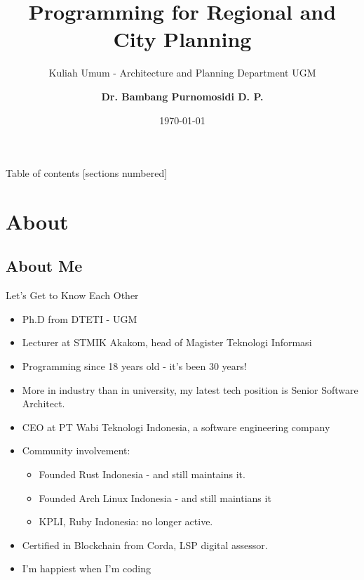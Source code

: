 \documentclass[10pt]{beamer}
\title{Programming for Regional and City Planning}
\subtitle{Kuliah Umum - Architecture and Planning Department UGM}
\date{\today}
\author{\textbf{Dr. Bambang Purnomosidi D. P.}}
\institute{Master in Information Technology Department - STMIK Akakom\\PT Wabi Teknologi Indonesia}
\begin{document}
\maketitle

\begin{frame}[allowframebreaks]{Table of contents}
  [sections numbered]
  \tableofcontents
\end{frame}

\section{About}

  \subsection{About Me}

    \begin{frame}[fragile]{Let's Get to Know Each Other}

      \begin{itemize}
        \item Ph.D from DTETI - UGM
        \item Lecturer at STMIK Akakom, head of Magister Teknologi Informasi 
        \item Programming since 18 years old - it’s been 30 years! 
        \item More in industry than in university, my latest tech position is Senior Software Architect.
        \item CEO at PT Wabi Teknologi Indonesia, a software engineering company
        \item Community involvement:
          \begin{itemize}
            \item Founded Rust Indonesia - and still maintains it.
            \item Founded Arch Linux Indonesia - and still maintians it
            \item KPLI, Ruby Indonesia: no longer active.
          \end{itemize}
        \item Certified in Blockchain from Corda, LSP digital assessor.
        \item I’m happiest when I’m coding
      \end{itemize}

    \end{frame}
\end{document}
